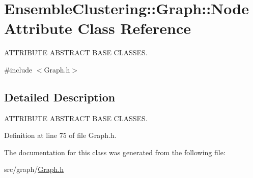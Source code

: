 \hypertarget{class_ensemble_clustering_1_1_graph_1_1_node_attribute}{\section{Ensemble\-Clustering\-:\-:Graph\-:\-:Node\-Attribute Class Reference}
\label{class_ensemble_clustering_1_1_graph_1_1_node_attribute}
}


A\-T\-T\-R\-I\-B\-U\-T\-E A\-B\-S\-T\-R\-A\-C\-T B\-A\-S\-E C\-L\-A\-S\-S\-E\-S.  




{\ttfamily \#include $<$Graph.\-h$>$}



\subsection{Detailed Description}
A\-T\-T\-R\-I\-B\-U\-T\-E A\-B\-S\-T\-R\-A\-C\-T B\-A\-S\-E C\-L\-A\-S\-S\-E\-S. 

Definition at line 75 of file Graph.\-h.



The documentation for this class was generated from the following file\-:\begin{DoxyCompactItemize}
\item 
src/graph/\hyperlink{_graph_8h}{Graph.\-h}\end{DoxyCompactItemize}
